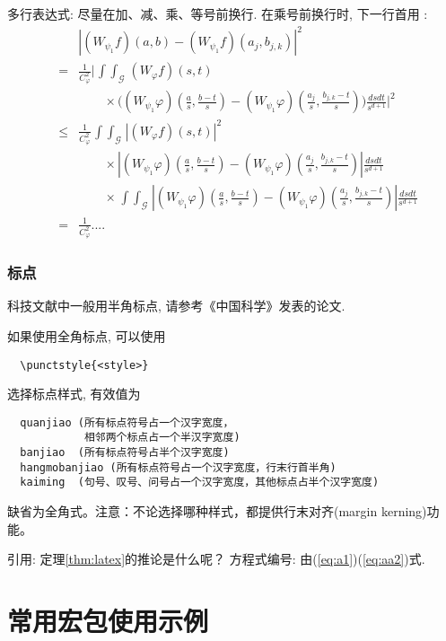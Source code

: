 \documentclass{nkuthesis}
\begin{document}
多行表达式: 尽量在加、减、乘、等号前换行. 在乘号前换行时,
下一行首用 \string\times:
\def\iint{\mathop{\int\!\!\!\int}}\def\calG{\mathcal G}
\begin{eqnarray}
&&\left|(W_{\psi_1}f)(a,b)-(W_{\psi_1}f)(a_j,b_{j,k})\right|^{2}\nonumber\\
&=&\frac{1}{C^{2}_{\varphi}}\Bigg|\iint_{\calG} (W_{\varphi}f)(s,t) \nonumber\\
&&\qquad\times \Bigg( (W_{\psi_1}\varphi)\left(\frac{a}{s},
\frac{b-t}{s}\right)
     -(W_{\psi_1}\varphi)\left(\frac{a_{j}}{s}, \frac{b_{j,k}-t}{s}\right)\Bigg)
  \frac{dsdt}{s^{d+1}}\Bigg|^2 \nonumber\\
&\le& \frac{1}{C^2_{\varphi}} \iint_{\calG} |(W_{\varphi}f)(s,t)|^2 \nonumber\\
&&\qquad \times\left| (W_{\psi_1}\varphi)\left(\frac{a}{s},
\frac{b-t}{s}\right)
    -(W_{\psi_1}\varphi)\left(\frac{a_{j}}{s}, \frac{b_{j,k}-t}{s}\right)\right|
   \frac{dsdt}{s^{d+1}}  \nonumber\\
&&\qquad \times   \iint_{\calG}\!
 \left|(W_{\psi_1}\varphi)\left(\frac{a}{s}, \frac{b-t}{s}\right)
    -(W_{\psi_1}\varphi)\left(\frac{a_{j}}{s}, \frac{b_{j,k}-t}{s}\right)\right|
 \frac{ ds dt}{s^{d+1}} \nonumber\\
&=& \frac{1}{C^2_{\varphi}} ....  \label{eq:a0}
\end{eqnarray}


\subsubsection{标点}
科技文献中一般用半角标点, 请参考《中国科学》发表的论文.

如果使用全角标点, 可以使用
\begin{verbatim}
  \punctstyle{<style>}
\end{verbatim}
选择标点样式, 有效值为
\begin{verbatim}
  quanjiao (所有标点符号占一个汉字宽度，
            相邻两个标点占一个半汉字宽度)
  banjiao  (所有标点符号占半个汉字宽度)
  hangmobanjiao (所有标点符号占一个汉字宽度，行末行首半角)
  kaiming  (句号、叹号、问号占一个汉字宽度，其他标点占半个汉字宽度)
\end{verbatim}
缺省为全角式。注意：不论选择哪种样式，都提供行末对齐(margin kerning)功能。


引用:   定理\ref{thm:latex}的推论是什么呢？
方程式编号:  由(\ref{eq:a1})(\ref{eq:aa2})式.

\section{常用宏包使用示例}
\end{document}
